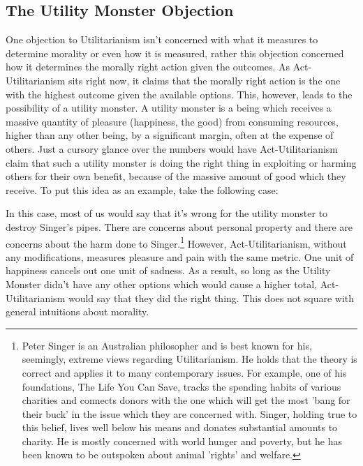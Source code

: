 \subsection{The Utility Monster Objection}

One objection to Utilitarianism isn't concerned with what it measures to determine morality or even how it is measured, rather this objection concerned how it determines the morally right action given the outcomes. As Act-Utilitarianism sits right now, it claims that the morally right action is the one with the highest outcome given the available options. This, however, leads to the possibility of a utility monster. A utility monster is a being which receives a massive quantity of pleasure (happiness, the good) from consuming resources, higher than any other being, by a significant margin, often at the expense of others. Just a cursory glance over the numbers would have Act-Utilitarianism claim that such a utility monster is doing the right thing in exploiting or harming others for their own benefit, because of the massive amount of good which they receive. To put this idea as an example, take the following case:


In this case, most of us would say that it's wrong for the utility monster to destroy Singer's pipes. There are concerns about personal property and there are concerns about the harm done to Singer.\footnote{Peter Singer is an Australian philosopher and is best known for his, seemingly, extreme views regarding Utilitarianism. He holds that the theory is correct and applies it to many contemporary issues. For example, one of his foundations, The Life You Can Save, tracks the spending habits of various charities and connects donors with the one which will get the most 'bang for their buck' in the issue which they are concerned with. Singer, holding true to this belief, lives well below his means and donates substantial amounts to charity. He is mostly concerned with world hunger and poverty, but he has been known to be outspoken about animal 'rights' and welfare. } However, Act-Utilitarianism, without any modifications, measures pleasure and pain with the same metric. One unit of happiness cancels out one unit of sadness. As a result, so long as the Utility Monster didn't have any other options which would cause a higher total, Act-Utilitarianism would say that they did the right thing. This does not square with general intuitions about morality. 


